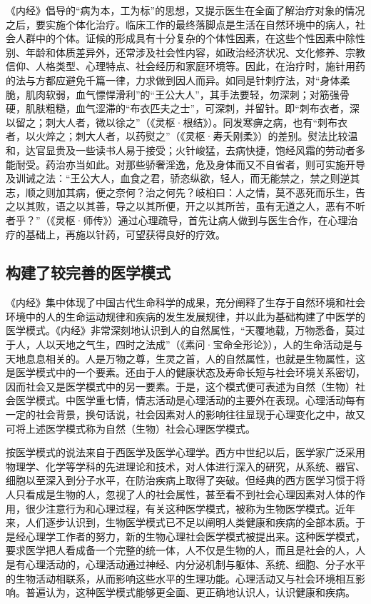 \documentclass[12pt]{ctexbook}
\begin{document}
《内经》倡导的“病为本，工为标”的思想，又提示医生在全面了解治疗对象的情况之后，要实施个体化治疗。临床工作的最终落脚点是生活在自然环境中的病人，社会人群中的个体。证候的形成具有十分复杂的个体性因素，在这些个性因素中除性别、年龄和体质差异外，还常涉及社会性内容，如政治经济状况、文化修养、宗教信仰、人格类型、心理特点、社会经历和家庭环境等。因此，在治疗时，施针用药的法与方都应避免千篇一律，力求做到因人而异。如同是针刺疗法，对“身体柔脆，肌肉软弱，血气慓悍滑利”的“王公大人”，其手法要轻，勿深刺；对筋强骨硬，肌肤粗糙，血气涩滞的“布衣匹夫之士”，可深刺，并留针。即“刺布衣者，深以留之；刺大人者，微以徐之”（《灵枢·根结》）。同发寒痹之病，也有“刺布衣者，以火焠之；刺大人者，以药熨之”（《灵枢·寿夭刚柔》）的差别。熨法比较温和，达官显贵及一些读书人易于接受；火针峻猛，去病快捷，饱经风霜的劳动者多能耐受。药治亦当如此。对那些骄奢淫逸，危及身体而又不自省者，则可实施开导及训诫之法：“王公大人，血食之君，骄恣纵欲，轻人，而无能禁之，禁之则逆其志，顺之则加其病，便之奈何？治之何先？岐桕曰：人之情，莫不恶死而乐生，告之以其败，语之以其善，导之以其所便，开之以其所苦，虽有无道之人，恶有不听者乎？”（《灵枢·师传》）通过心理疏导，首先让病人做到与医生合作，在心理治疗的基础上，再施以针药，可望获得良好的疗效。

\subsection{构建了较完善的医学模式}%

《内经》集中体现了中国古代生命科学的成果，充分阐释了生存于自然环境和社会环境中的人的生命运动规律和疾病的发生发展规律，并以此为基础构建了中医学的医学模式。《内经》非常深刻地认识到人的自然属性，“天覆地载，万物悉备，莫过于人，人以天地之气生，四时之法成”（《素问·宝命全形论》），人的生命活动是与天地息息相关的。人是万物之尊，生灵之首，人的自然属性，也就是生物属性，这是医学模式中的一个要素。还由于人的健康状态及寿命长短与社会环境关系密切，因而社会又是医学模式中的另一要素。于是，这个模式便可表述为自然（生物）社会医学模式。中医学重七情，情志活动是心理活动的主要外在表现。心理活动每有一定的社会背景，换句话说，社会因素对人的影响往往显现于心理变化之中，故又可将上述医学模式称为自然（生物）社会心理医学模式。

按医学模式的说法来自于西医学及医学心理学。西方中世纪以后，医学家广泛采用物理学、化学等学科的先进理论和技术，对人体进行深入的研究，从系统、器官、细胞以至深入到分子水平，在防治疾病上取得了突破。但经典的西方医学习惯于将人只看成是生物的人，忽视了人的社会属性，甚至看不到社会心理因素对人体的作用，很少注意行为和心理过程，有关这种医学模式，被称为生物医学模式。近年来，人们逐步认识到，生物医学模式已不足以阐明人类健康和疾病的全部本质。于是经心理学工作者的努力，新的生物心理社会医学模式被提出来。这种医学模式，要求医学把人看成备一个完整的统一体，人不仅是生物的人，而且是社会的人，人是有心理活动的，心理活动通过神经、内分泌机制与躯体、系统、细胞、分子水平的生物活动相联系，从而影响这些水平的生理功能。心理活动又与社会环境相互影响。普遍认为，这种医学模式能够更全面、更正确地认识人，认识健康和疾病。
\end{document}

